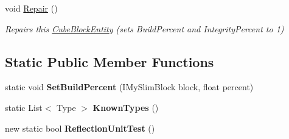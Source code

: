 \begin{DoxyCompactItemize}
\item 
void \hyperlink{class_s_e_mod_a_p_i_internal_1_1_a_p_i_1_1_entity_1_1_sector_1_1_sector_object_1_1_cube_grid_1_1_cube_block_entity_a9a91fa92df02324426a4a2cc1c8a1258}{Repair} ()
\begin{DoxyCompactList}\small\item\em Repairs this \hyperlink{class_s_e_mod_a_p_i_internal_1_1_a_p_i_1_1_entity_1_1_sector_1_1_sector_object_1_1_cube_grid_1_1_cube_block_entity}{Cube\+Block\+Entity} (sets Build\+Percent and Integrity\+Percent to 1) \end{DoxyCompactList}\end{DoxyCompactItemize}
\subsection*{Static Public Member Functions}
\begin{DoxyCompactItemize}
\item 
\hypertarget{class_s_e_mod_a_p_i_internal_1_1_a_p_i_1_1_entity_1_1_sector_1_1_sector_object_1_1_cube_grid_1_1_cube_block_entity_a5702082c0d062dfc049a6d86f0523bce}{}static void {\bfseries Set\+Build\+Percent} (I\+My\+Slim\+Block block, float percent)\label{class_s_e_mod_a_p_i_internal_1_1_a_p_i_1_1_entity_1_1_sector_1_1_sector_object_1_1_cube_grid_1_1_cube_block_entity_a5702082c0d062dfc049a6d86f0523bce}

\item 
\hypertarget{class_s_e_mod_a_p_i_internal_1_1_a_p_i_1_1_entity_1_1_sector_1_1_sector_object_1_1_cube_grid_1_1_cube_block_entity_a69fa97ef9f84e0a6e064e1aa4c521926}{}static List$<$ Type $>$ {\bfseries Known\+Types} ()\label{class_s_e_mod_a_p_i_internal_1_1_a_p_i_1_1_entity_1_1_sector_1_1_sector_object_1_1_cube_grid_1_1_cube_block_entity_a69fa97ef9f84e0a6e064e1aa4c521926}

\item 
\hypertarget{class_s_e_mod_a_p_i_internal_1_1_a_p_i_1_1_entity_1_1_sector_1_1_sector_object_1_1_cube_grid_1_1_cube_block_entity_ad133ecd59c1c46d526f07acea0c73a1d}{}new static bool {\bfseries Reflection\+Unit\+Test} ()\label{class_s_e_mod_a_p_i_internal_1_1_a_p_i_1_1_entity_1_1_sector_1_1_sector_object_1_1_cube_grid_1_1_cube_block_entity_ad133ecd59c1c46d526f07acea0c73a1d}

\end{DoxyCompactItemize}
